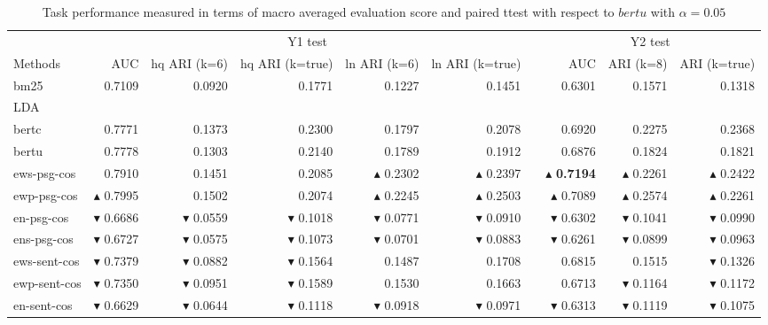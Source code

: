 \begin{table}[t]
\centering
\caption{Task performance measured in terms of macro averaged evaluation score and paired ttest with respect to $bertu$ with $\alpha = 0.05$}
\label{tab:by1}
\begin{tabular}{@{}lrrrrrrrrr@{}}\toprule
& \multicolumn{5}{c}{Y1 test} && \multicolumn{3}{c}{Y2 test}  \\
\cmidrule(r){2-6}
\cmidrule(r){8-10}
Methods & AUC & hq ARI (k=6) & hq ARI (k=true) & ln ARI (k=6) & ln ARI (k=true) && AUC & ARI (k=8) & ARI (k=true) \\\midrule
bm25 & 0.7109 & 0.0920 & 0.1771 & 0.1227 & 0.1451 && 0.6301 & 0.1571 & 0.1318 \\
LDA & & & & & && & & \\
bertc & 0.7771 & 0.1373 & 0.2300 & 0.1797 & 0.2078 && 0.6920 & 0.2275 & 0.2368 \\ 
bertu & 0.7778 & 0.1303 & 0.2140 & 0.1789 & 0.1912 && 0.6876 & 0.1824 & 0.1821 \\\midrule
ews-psg-cos & 0.7910 & 0.1451 & 0.2085 & $\blacktriangle$ 0.2302 & $\blacktriangle$ 0.2397 && $\blacktriangle$ \textbf{0.7194} & $\blacktriangle$ 0.2261 & $\blacktriangle$ 0.2422 \\ 
ewp-psg-cos & $\blacktriangle$ 0.7995 & 0.1502 & 0.2074 & $\blacktriangle$ 0.2245 & $\blacktriangle$ 0.2503 && $\blacktriangle$ 0.7089 & $\blacktriangle$ 0.2574 & $\blacktriangle$ 0.2261 \\ 
en-psg-cos & $\blacktriangledown$ 0.6686 & $\blacktriangledown$ 0.0559 & $\blacktriangledown$ 0.1018 & $\blacktriangledown$ 0.0771 & $\blacktriangledown$ 0.0910 && $\blacktriangledown$ 0.6302 & $\blacktriangledown$ 0.1041 & $\blacktriangledown$ 0.0990 \\ 
ens-psg-cos & $\blacktriangledown$ 0.6727 & $\blacktriangledown$ 0.0575 & $\blacktriangledown$ 0.1073 & $\blacktriangledown$ 0.0701 & $\blacktriangledown$ 0.0883 && $\blacktriangledown$ 0.6261 & $\blacktriangledown$ 0.0899 & $\blacktriangledown$ 0.0963 \\\midrule
ews-sent-cos & $\blacktriangledown$ 0.7379 & $\blacktriangledown$ 0.0882 & $\blacktriangledown$ 0.1564 & 0.1487 & 0.1708 && 0.6815 & 0.1515 & $\blacktriangledown$ 0.1326 \\ 
ewp-sent-cos & $\blacktriangledown$ 0.7350 & $\blacktriangledown$ 0.0951 & $\blacktriangledown$ 0.1589 & 0.1530 & 0.1663 && 0.6713 & $\blacktriangledown$ 0.1164 & $\blacktriangledown$ 0.1172 \\ 
en-sent-cos & $\blacktriangledown$ 0.6629 & $\blacktriangledown$ 0.0644 & $\blacktriangledown$ 0.1118 & $\blacktriangledown$ 0.0918 & $\blacktriangledown$ 0.0971 && $\blacktriangledown$ 0.6313 & $\blacktriangledown$ 0.1119 & $\blacktriangledown$ 0.1075 \\ 

\end{tabular}
\end{table}
